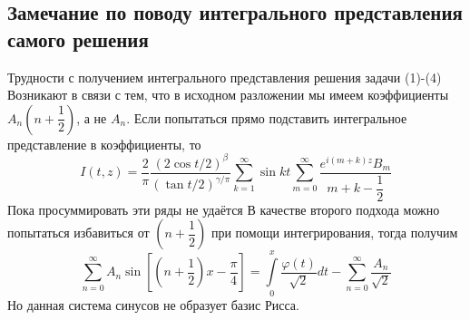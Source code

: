 \documentclass[12pt, a4paper]{extarticle}
\numberwithin{equation}{section}
\numberwithin{lemma}{section}
\numberwithin{definition}{section}
\numberwithin{notabene}{section}
\numberwithin{corollary}{section}
\begin{document}
	\subsection*{Замечание по поводу интегрального представления самого решения}
	Трудности с получением интегрального представления решения задачи (1)-(4) Возникают в связи с тем, что в исходном разложении мы имеем коэффициенты $A_n\left(n+\dfrac12\right)$, а не $A_n$. Если попытаться прямо подставить интегральное представление в коэффициенты, то
	\begin{equation*}
		I(t,z) = \dfrac{2}{\pi}\dfrac{(2\cos{t/2})^\beta}{(\tan{t/2})^{\gamma/\pi}}  \sum\limits_{k=1}^{\infty} \sin{kt} \sum\limits_{m=0}^{\infty} \dfrac{e^{i(m+k)z} B_m}{m+k-\dfrac12}
	\end{equation*}
	Пока просуммировать эти ряды не удаётся\newline
	В качестве второго подхода можно попытаться избавиться от $\left(n+\dfrac12\right)$ при помощи интегрирования, тогда получим
	\begin{equation*}
		\sum\limits_{n=0}^{\infty} A_n \sin{\left[\left(n+\dfrac12\right)x - \dfrac\pi4\right]} = \int\limits_0^x \dfrac{\varphi(t)}{\sqrt2}dt - \sum\limits_{n=0}^{\infty} \dfrac{A_n}{\sqrt2}
	\end{equation*}
	Но данная система синусов не образует базис Рисса.
\end{document}
